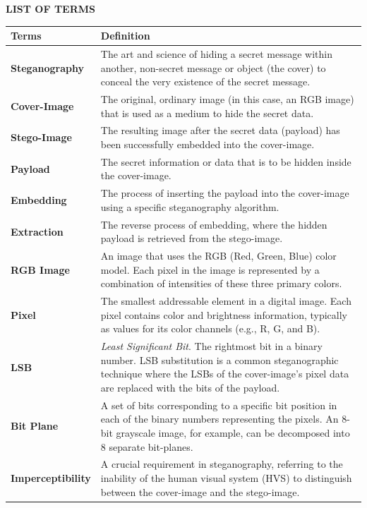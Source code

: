 \begin{center}  
\normalfont\LARGE\textbf{LIST OF TERMS}
\end{center}
\begin{longtable}{p{3.5cm} p{10.5cm}}
	\textbf{Terms} & \textbf{Definition}\\
	\hline \endhead
	\textbf{Steganography} & The art and science of hiding a secret message within another, non-secret message or object (the cover) to conceal the very existence of the secret message. \\
	\textbf{Cover-Image} & The original, ordinary image (in this case, an RGB image) that is used as a medium to hide the secret data. \\
	\textbf{Stego-Image} & The resulting image after the secret data (payload) has been successfully embedded into the cover-image. \\
	\textbf{Payload} & The secret information or data that is to be hidden inside the cover-image. \\
	\textbf{Embedding} & The process of inserting the payload into the cover-image using a specific steganography algorithm. \\
	\textbf{Extraction} & The reverse process of embedding, where the hidden payload is retrieved from the stego-image. \\
	\textbf{RGB Image} & An image that uses the RGB (Red, Green, Blue) color model. Each pixel in the image is represented by a combination of intensities of these three primary colors. \\
	\textbf{Pixel} & The smallest addressable element in a digital image. Each pixel contains color and brightness information, typically as values for its color channels (e.g., R, G, and B). \\
	\textbf{LSB} & \textit{Least Significant Bit}. The rightmost bit in a binary number. LSB substitution is a common steganographic technique where the LSBs of the cover-image's pixel data are replaced with the bits of the payload. \\
	\textbf{Bit Plane} & A set of bits corresponding to a specific bit position in each of the binary numbers representing the pixels. An 8-bit grayscale image, for example, can be decomposed into 8 separate bit-planes. \\
	\textbf{Imperceptibility} & A crucial requirement in steganography, referring to the inability of the human visual system (HVS) to distinguish between the cover-image and the stego-image. \\

\end{longtable}
